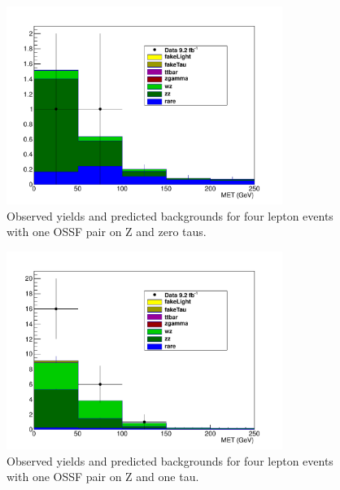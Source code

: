 \begin{figure}[htp]
\begin{center}
\includegraphics[width=0.8\textwidth]{plots/4L_MET_dist_onZ_ossf1_tau0_note.pdf}
\caption{Observed yields and predicted backgrounds for four lepton events with one OSSF pair on Z and zero taus.}
\label{fig:L4OSSF1onZtau0}
\end{center}
\end{figure}
\begin{figure}[htp]
\begin{center}
\includegraphics[width=0.8\textwidth]{plots/4L_MET_dist_onZ_ossf1_tau1_note.pdf}
\caption{Observed yields and predicted backgrounds for four lepton events with one OSSF pair on Z and one tau.}
\label{fig:L4OSSF1onZtau1}
\end{center}
\end{figure}
